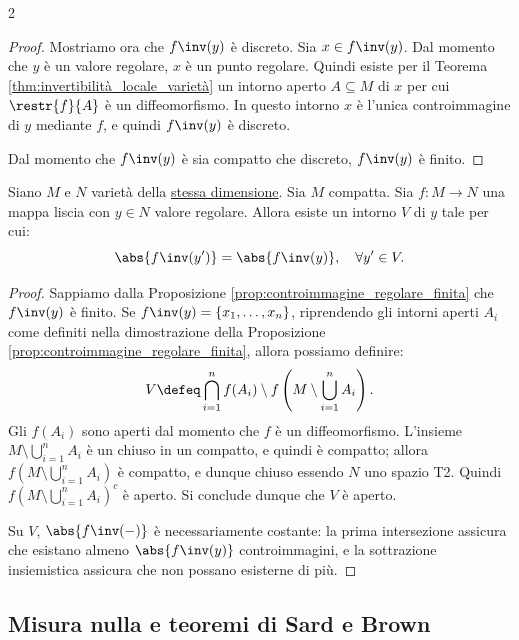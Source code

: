 \begin{multicols*}{2}
\begin{proof}
        Mostriamo ora che $f\inv(y)$ è discreto. Sia $x \in f\inv(y)$. Dal momento che $y$ è un valore regolare,
        $x$ è un punto regolare. Quindi esiste per il Teorema \ref{thm:invertibilità_locale_varietà} un
        intorno aperto $A \subseteq M$ di $x$ per cui $\restr{f}{A}$ è un diffeomorfismo. In questo intorno $x$
        è l'unica controimmagine di $y$ mediante $f$, e quindi $f\inv(y)$ è discreto. \smallskip

        Dal momento che $f\inv(y)$ è sia compatto che discreto, $f\inv(y)$ è finito.
    \end{proof}

    \begin{lemma} \label{lem:pila}
        Siano $M$ e $N$ varietà della \underline{stessa dimensione}.
        Sia $M$ compatta. Sia $f : M \to N$ una mappa liscia con $y \in N$ valore regolare.
        Allora esiste un intorno $V$ di $y$ tale per cui:
        \[
            \abs{f\inv(y')} = \abs{f\inv(y)}, \quad \forall y' \in V.
        \]
    \end{lemma}

    \begin{proof}
        Sappiamo dalla Proposizione \ref{prop:controimmagine_regolare_finita} che
        $f\inv(y)$ è finito. Se $f\inv(y) = \{x_1, \ldots, x_n\}$, riprendendo gli intorni aperti $A_i$
        come definiti nella dimostrazione della Proposizione \ref{prop:controimmagine_regolare_finita},
        allora possiamo definire:
        \[
            V \defeq \bigcap_{i = 1}^n f(A_i) \setminus f\left(M \setminus \bigcup_{i = 1}^n A_i\right).
        \]
        Gli $f(A_i)$ sono aperti dal momento che $f$ è un diffeomorfismo. L'insieme $M \setminus \bigcup_{i = 1}^n A_i$
        è un chiuso in un compatto, e quindi è compatto; allora $f\left(M \setminus \bigcup_{i = 1}^n A_i\right)$ è compatto,
        e dunque chiuso essendo $N$ uno spazio T2. Quindi $f\left(M \setminus \bigcup_{i = 1}^n A_i\right)^c$ è aperto.
        Si conclude dunque che $V$ è aperto. \smallskip

        Su $V$, $\abs{f\inv(-)}$ è necessariamente costante: la prima intersezione assicura che esistano
        almeno $\abs{f\inv(y)}$ controimmagini, e la sottrazione insiemistica assicura che non possano esisterne di più.
    \end{proof}

    \subsection{Misura nulla e teoremi di Sard e Brown}


\end{multicols*}
